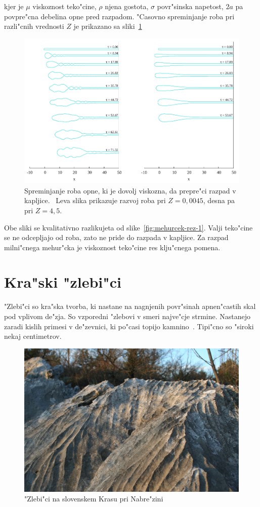 \documentclass[a4paper,12pt]{article}
\begin{document}
kjer je $\mu$ viskoznost teko"cine, $\rho$ njena gostota, $\sigma$ povr"sinska napetost, $2a$ pa povpre"cna debelina opne pred razpadom. "Casovno spreminjanje roba pri razli"cnih vrednosti $Z$ je prikazano sa sliki~\ref{fig:mehurcek-rez-vis-1}

\begin{figure}[h]
  \centering
\includegraphics[width=.9\textwidth]{./Slike/scat-rezultat-1}
\caption{Spreminjanje roba opne, ki je dovolj viskozna, da prepre"ci razpad v kapljice.~\cite{scat}
Leva slika prikazuje razvoj roba pri $Z=0,0045$, desna pa pri $Z=4,5$. }
\label{fig:mehurcek-rez-vis-1}
\end{figure}

Obe sliki se kvalitativno razlikujeta od slike~\ref{fig:mehurcek-rez-1}. Valji teko"cine se ne odcepljajo od roba, zato ne pride do razpada v kapljice. Za razpad milni"cnega mehur"cka je viskoznost teko"cine res klju"cnega pomena. 

\section{Kra"ski "zlebi"ci}

"Zlebi"ci so kra"ska tvorba, ki nastane na nagnjenih povr"sinah apnen"castih skal pod vplivom de"zja. So vzporedni "zlebovi v smeri najve"cje strmine. Nastanejo zaradi kislih primesi v de"zevnici, ki po"casi topijo kamnino~\cite{perne,perne-seminar}. Tipi"cno so "siroki nekaj centimetrov. 

\begin{figure}[h]
\centering
 \includegraphics[width=.8\textwidth]{./Slike/Zlebici}
 \caption{"Zlebi"ci na slovenskem Krasu pri Nabre"zini~\cite{wiki:zlebic} }
 \label{fig:zlebici-slika}
\end{figure}
\end{document}
